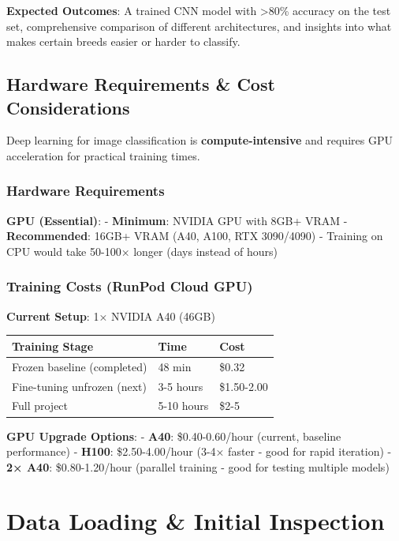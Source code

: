 \documentclass[
  letterpaper,
  DIV=11,
  numbers=noendperiod]{scrartcl}
\begin{document}
\textbf{Expected Outcomes}: A trained CNN model with \textgreater80\%
accuracy on the test set, comprehensive comparison of different
architectures, and insights into what makes certain breeds easier or
harder to classify.

\subsection{Hardware Requirements \& Cost
Considerations}\label{hardware-requirements-cost-considerations}

Deep learning for image classification is \textbf{compute-intensive} and
requires GPU acceleration for practical training times.

\subsubsection{Hardware Requirements}\label{hardware-requirements}

\textbf{GPU (Essential)}: - \textbf{Minimum}: NVIDIA GPU with 8GB+ VRAM
- \textbf{Recommended}: 16GB+ VRAM (A40, A100, RTX 3090/4090) - Training
on CPU would take 50-100× longer (days instead of hours)

\subsubsection{Training Costs (RunPod Cloud
GPU)}\label{training-costs-runpod-cloud-gpu}

\textbf{Current Setup}: 1× NVIDIA A40 (46GB)

\begin{longtable}[]{@{}lll@{}}
\toprule\noalign{}
Training Stage & Time & Cost \\
\midrule\noalign{}
\endhead
\bottomrule\noalign{}
\endlastfoot
Frozen baseline (completed) & 48 min & \$0.32 \\
Fine-tuning unfrozen (next) & 3-5 hours & \$1.50-2.00 \\
Full project & 5-10 hours & \$2-5 \\
\end{longtable}

\textbf{GPU Upgrade Options}: - \textbf{A40}: \$0.40-0.60/hour (current,
baseline performance) - \textbf{H100}: \$2.50-4.00/hour (3-4× faster -
good for rapid iteration) - \textbf{2× A40}: \$0.80-1.20/hour (parallel
training - good for testing multiple models)

\section{Data Loading \& Initial
Inspection}\label{data-loading-initial-inspection}
\end{document}
